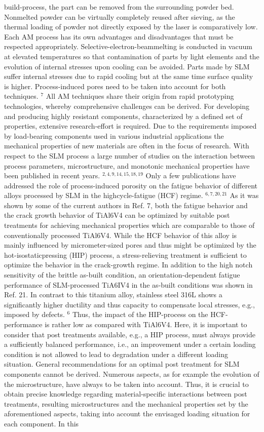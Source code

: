 \documentclass[10pt]{article}
\begin{document}
build-process, the part can be removed from the surrounding powder bed. Nonmelted powder can be virtually completely reused after sieving, as the thermal loading of powder not directly exposed by the laser is comparatively low. Each AM process has its own advantages and disadvantages that must be respected appropriately. Selective-electron-beammelting is conducted in vacuum at elevated temperatures so that contamination of parts by light elements and the evolution of internal stresses upon cooling can be avoided. Parts made by SLM suffer internal stresses due to rapid cooling but at the same time surface quality is higher. Process-induced pores need to be taken into account for both techniques. ${ }^{7}$ All AM techniques share their origin from rapid prototyping technologies, whereby comprehensive challenges can be derived. For developing and producing highly resistant components, characterized by a defined set of properties, extensive research-effort is required. Due to the requirements imposed by load-bearing components used in various industrial applications the mechanical properties of new materials are often in the focus of research. With respect to the SLM process a large number of studies on the interaction between process parameters, microstructure, and monotonic mechanical properties have been published in recent years. ${ }^{2,4,9,14,15,18,19}$ Only a few publications have addressed the role of process-induced porosity on the fatigue behavior of different alloys processed by SLM in the highcycle-fatigue (HCF) regime. ${ }^{6,7,20,21}$ As it was shown by some of the current authors in Ref. 7, both the fatigue behavior and the crack growth behavior of TiAl6V4 can be optimized by suitable post treatments for achieving mechanical properties which are comparable to those of conventionally processed TiAl6V4. While the HCF behavior of this alloy is mainly influenced by micrometer-sized pores and thus might be optimized by the hot-isostaticpressing (HIP) process, a stress-relieving treatment is sufficient to optimize the behavior in the crack-growth regime. In addition to the high notch sensitivity of the brittle as-built condition, an orientation-dependent fatigue performance of SLM-processed TiA6IV4 in the as-built conditions was shown in Ref. 21. In contrast to this titanium alloy, stainless steel 316L shows a significantly higher ductility and thus capacity to compensate local stresses, e.g., imposed by defects. ${ }^{6}$ Thus, the impact of the HIP-process on the HCF-performance is rather low as compared with TiAl6V4. Here, it is important to consider that post treatments available, e.g., a HIP process, must always provide a sufficiently balanced performance, i.e., an improvement under a certain loading condition is not allowed to lead to degradation under a different loading situation. General recommendations for an optimal post treatment for SLM components cannot be derived. Numerous aspects, as for example the evolution of the microstructure, have always to be taken into account. Thus, it is crucial to obtain precise knowledge regarding material-specific interactions between post treatments, resulting microstructures and the mechanical properties set by the aforementioned aspects, taking into account the envisaged loading situation for each component. In this 
\end{document}
